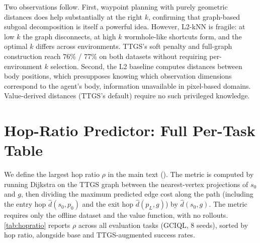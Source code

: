 \documentclass{article} %
\begin{document}
Two observations follow. First, waypoint planning with purely geometric distances does help substantially at the right $k$, confirming that graph-based subgoal decomposition is itself a powerful idea. However, L2-kNN is fragile: at low $k$ the graph disconnects, at high $k$ wormhole-like shortcuts form, and the optimal $k$ differs across environments. TTGS's soft penalty and full-graph construction reach 76\% / 77\% on both datasets without requiring per-environment $k$ selection. Second, the L2 baseline computes distances between body positions, which presupposes knowing which observation dimensions correspond to the agent's body, information unavailable in pixel-based domains. Value-derived distances (TTGS's default) require no such privileged knowledge.

\section{Hop-Ratio Predictor: Full Per-Task Table} \label{apdx:hopratio}

We define the largest hop ratio $\rho$ in the main text (). The metric is computed by running Dijkstra on the TTGS graph between the nearest-vertex projections of $s_0$ and $g$, then dividing the maximum predicted edge cost along the path (including the entry hop $\hat d(s_0, p_0)$ and the exit hop $\hat d(p_L, g)$) by $\hat d(s_0, g)$. The metric requires only the offline dataset and the value function, with no rollouts. \autoref{tab:hopratio} reports $\rho$ across all evaluation tasks (GCIQL, 8 seeds), sorted by hop ratio, alongside base and TTGS-augmented success rates.
\end{document}
